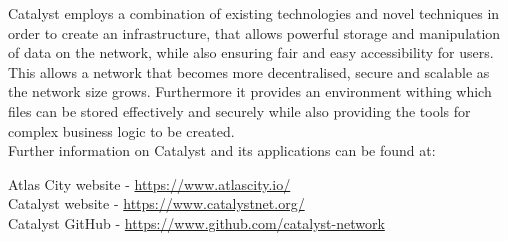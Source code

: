Catalyst employs a combination of existing technologies and novel techniques in order to create an infrastructure, that allows powerful storage and manipulation of data on the network, while also ensuring fair and easy accessibility for users. This allows a network that becomes more decentralised, secure and scalable as the network size grows. Furthermore it provides an environment withing which files can be stored effectively and securely while also providing the tools for complex business logic to be created.  \\

Further information on Catalyst and its applications can be found at: \\
\begin{center}
Atlas City website - \url{https://www.atlascity.io/} \\
Catalyst website - \url{https://www.catalystnet.org/}\\
Catalyst GitHub - \url{https://www.github.com/catalyst-network}\\
\end{center}